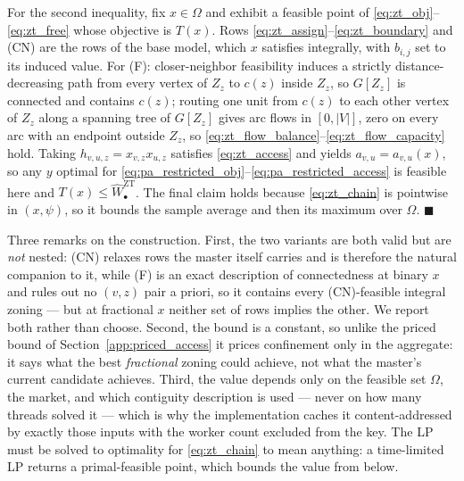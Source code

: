 \documentclass{article}
\begin{document}
For the second inequality, fix $x \in \Omega$ and exhibit a feasible point of \eqref{eq:zt_obj}--\eqref{eq:zt_free} whose objective is $T(x)$. Rows \eqref{eq:zt_assign}--\eqref{eq:zt_boundary} and (CN) are the rows of the base model, which $x$ satisfies integrally, with $b_{i,j}$ set to its induced value. For (F): closer-neighbor feasibility induces a strictly distance-decreasing path from every vertex of $Z_z$ to $c(z)$ inside $Z_z$, so $G[Z_z]$ is connected and contains $c(z)$; routing one unit from $c(z)$ to each other vertex of $Z_z$ along a spanning tree of $G[Z_z]$ gives arc flows in $[0, |V|]$, zero on every arc with an endpoint outside $Z_z$, so \eqref{eq:zt_flow_balance}--\eqref{eq:zt_flow_capacity} hold. Taking $h_{v,u,z} = x_{v,z} x_{u,z}$ satisfies \eqref{eq:zt_access} and yields $a_{v,u} = a_{v,u}(x)$, so any $y$ optimal for \eqref{eq:pa_restricted_obj}--\eqref{eq:pa_restricted_access} is feasible here and $T(x) \leq \widehat{W}^{\mathrm{ZT}}_{\bullet}$. The final claim holds because \eqref{eq:zt_chain} is pointwise in $(x, \psi)$, so it bounds the sample average and then its maximum over $\Omega$. $\blacksquare$

Three remarks on the construction. First, the two variants are both valid but are \emph{not} nested: (CN) relaxes rows the master itself carries and is therefore the natural companion to it, while (F) is an exact description of connectedness at binary $x$ and rules out no $(v,z)$ pair a priori, so it contains every (CN)-feasible integral zoning --- but at fractional $x$ neither set of rows implies the other. We report both rather than choose. Second, the bound is a constant, so unlike the priced bound of Section~\ref{app:priced_access} it prices confinement only in the aggregate: it says what the best \emph{fractional} zoning could achieve, not what the master's current candidate achieves. Third, the value depends only on the feasible set $\Omega$, the market, and which contiguity description is used --- never on how many threads solved it --- which is why the implementation caches it content-addressed by exactly those inputs with the worker count excluded from the key. The LP must be solved to optimality for \eqref{eq:zt_chain} to mean anything: a time-limited LP returns a primal-feasible point, which bounds the value from below.
\end{document}
